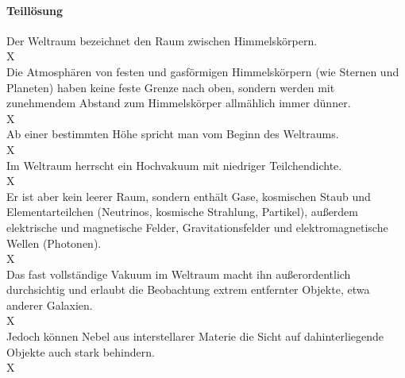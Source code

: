\paragraph*{Teillösung}


\begin{exe}
  \ex \gll Der Weltraum bezeichnet den Raum zwischen Himmelskörpern.\\
  X\\
  \ex \gll Die Atmosphären von festen und gasförmigen Himmelskörpern (wie Sternen und Planeten) haben keine feste Grenze nach oben, sondern werden mit zunehmendem Abstand zum Himmelskörper allmählich immer dünner.\\
  X\\
  \ex \gll Ab einer bestimmten Höhe spricht man vom Beginn des Weltraums.\\
  X\\
  \ex \gll Im Weltraum herrscht ein Hochvakuum mit niedriger Teilchendichte.\\
  X\\
  \ex \gll Er ist aber kein leerer Raum, sondern enthält Gase, kosmischen Staub und Elementarteilchen (Neutrinos, kosmische Strahlung, Partikel), außerdem elektrische und magnetische Felder, Gravitationsfelder und elektromagnetische Wellen (Photonen).\\
  X\\
  \ex \gll Das fast vollständige Vakuum im Weltraum macht ihn außerordentlich durchsichtig und erlaubt die Beobachtung extrem entfernter Objekte, etwa anderer Galaxien.\\
  X\\
  \ex \gll Jedoch können Nebel aus interstellarer Materie die Sicht auf dahinterliegende Objekte auch stark behindern.\\
  X\\
\end{exe}
